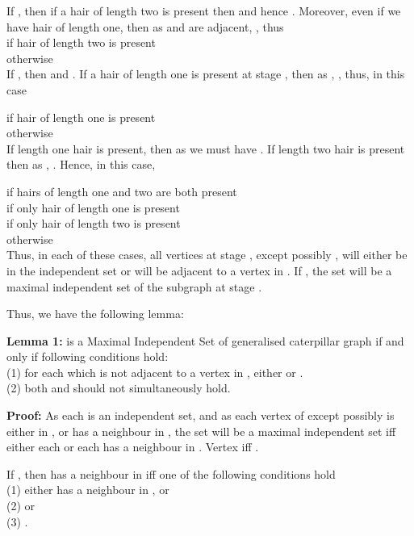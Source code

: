 \documentclass[10pt]{article}
\begin{document}
 If ,
then if a hair of length two is present then  and hence
. Moreover, even if we have hair of length one, then as 
and  are adjacent, , thus \\

\noindent \noindent  if hair of length two is present \\ 
otherwise\\

 If , then  and . If a hair of length one is present at stage
, then as , , thus, in this case

\noindent  if hair of length one is present \\  
otherwise\\

 If length one hair is present,
then as  we must have . If length two hair is
present then as , . Hence, in this case,

\noindent   if hairs of length one
and two are both present \\   if only hair of length one
is present \\   if only hair of length two is present \\
 otherwise\\

Thus, in each of these cases, all vertices at stage , except possibly
, will either be in the independent set  or will be adjacent to
a vertex in . If , the set  will be a maximal
independent set of the subgraph at stage .

Thus, we have the following lemma:

{\textbf{Lemma 1:}}  is a Maximal
Independent Set of generalised caterpillar graph  if and
only if following conditions hold: \\ (1) for each  which is not
adjacent to a vertex in , either  or .\\ (2) both  and  should not
simultaneously hold.

{\textbf{Proof:}} As each  is an independent set, and as each vertex
of  except possibly  is either in , or has a neighbour in
, the set  will be a maximal independent set iff either each
 or each  has a neighbour in .  Vertex  iff
.

If , then  has a neighbour in  iff one of the
following conditions hold\\ (1) either  has a neighbour in ,
or\\ (2)  or\\ (3) .
\end{document}

